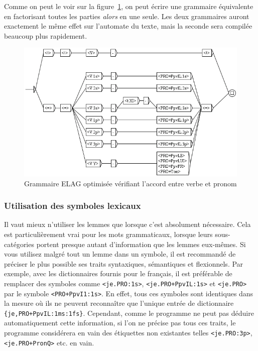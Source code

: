 \bigskip
\noindent Comme on peut le voir sur la figure~\ref{fig-NA-good}, on peut écrire une grammaire
équivalente en factorisant toutes les parties \textit{alors} en une seule. Les deux grammaires auront exactement le même effet sur l’automate du texte, mais la seconde sera compilée beaucoup plus rapidement.


\begin{figure}[!h]
\begin{center}
\includegraphics[width=15cm]{resources/img/fig7-22.png}
\caption{Grammaire ELAG optimisée vérifiant l’accord entre verbe et pronom\label{fig-NA-good}}
\end{center}
\end{figure}


\subsubsection{Utilisation des symboles lexicaux}
\noindent Il vaut mieux n’utiliser les lemmes que lorsque c’est absolument nécessaire. Cela est
particulièrement vrai pour les mots grammaticaux, lorsque leurs sous-catégories portent
presque autant d’information que les lemmes eux-mêmes. Si vous utilisez malgré tout un
lemme dans un symbole, il est recommandé de préciser le plus possible ses traits syntaxiques, 
sémantiques et flexionnels.
Par exemple, avec les dictionnaires fournis pour le français, il est préférable de remplacer des 
symboles comme \verb$<je.PRO:1s>$, \verb$<je.PRO+PpvIL:1s>$ et \verb$<je.PRO>$
par le symbole \verb$<PRO+PpvI1:1s>$. En effet, tous ces symboles sont identiques dans la 
mesure où ils ne peuvent reconnaître que l’unique entrée de dictionnaire 
\verb${je,PRO+PpvIL:1ms:1fs}$. Cependant, comme le programme ne peut pas déduire automatiquement
cette information, si l’on ne précise pas tous ces traits, le programme considérera en vain des 
étiquettes non existantes telles \verb$<je.PRO:3p>$, \verb$<je.PRO+PronQ>$ etc. en vain.


